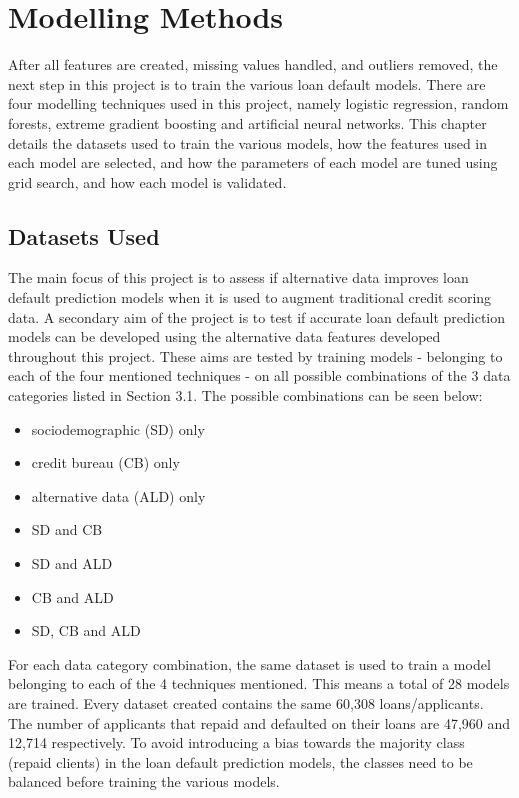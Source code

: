 \chapter{Modelling Methods} 
\label{Chapter4}

After all features are created, missing values handled, and outliers removed, the next step in this project is to train the various loan default models. There are four modelling techniques used in this project, namely logistic regression, random forests, extreme gradient boosting and artificial neural networks. This chapter details the datasets used to train the various models, how the features used in each model are selected, and how the parameters of each model are tuned using grid search, and how each model is validated. \\

\section{Datasets Used}

The main focus of this project is to assess if alternative data improves loan default prediction models when it is used to augment traditional credit scoring data. A secondary aim of the project is to test if accurate loan default prediction models can be developed using the alternative data features developed throughout this project. These aims are tested by training models - belonging to each of the four mentioned techniques - on all possible combinations of the 3 data categories listed in Section 3.1. The possible combinations can be seen below: 

\vspace{10pt}

\begin{itemize}
    \item sociodemographic (SD) only 
    \item credit bureau (CB) only 
    \item alternative data (ALD) only 
    \item SD and CB
    \item SD and ALD
    \item CB and ALD
    \item SD, CB and ALD
\end{itemize}

\vspace{10pt}

For each data category combination, the same dataset is used to train a model belonging to each of the 4 techniques mentioned. This means a total of 
28 models are trained. Every dataset created contains the same 60,308 loans/applicants. The number of applicants that repaid and defaulted on their loans are 47,960 and 12,714 respectively. To avoid introducing a bias towards the majority class (repaid clients) in the loan default prediction models, the classes need to be balanced before training the various models. 

